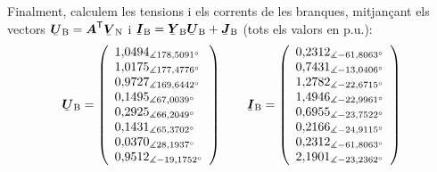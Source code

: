 \begin{exemple}
Finalment, calculem les tensions i els corrents de les branques,
mitjan\c{c}ant els vectors $\mcmplx{U}\ped{B} = \transp{\boldsymbol{A}}
\mcmplx{V}\ped{N}$ i $\mcmplx{I}\ped{B} =  \mcmplx{Y}\ped{B}
\mcmplx{U}\ped{B} + \mcmplx{J}\ped{B}$ (tots els valors en p.u.):
\[
   \mcmplx{U}\ped{B} =
   \left(\begin{array}{l}
     1{,}0494_{\measuredangle 178{,}5091\degree} \\
     1{,}0175_{\measuredangle 177{,}4776\degree} \\
     0{,}9727_{\measuredangle 169{,}6442\degree} \\
     0{,}1495_{\measuredangle 67{,}0039\degree} \\
     0{,}2925_{\measuredangle 66{,}2049\degree} \\
     0{,}1431_{\measuredangle 65{,}3702\degree} \\
     0{,}0370_{\measuredangle 28{,}1937\degree} \\
     0{,}9512_{\measuredangle -19{,}1752\degree}
   \end{array}\right)
   \qquad
   \mcmplx{I}\ped{B} =
   \left(\begin{array}{l}
     0{,}2312_{\measuredangle -61{,}8063\degree} \\
     0{,}7431_{\measuredangle -13{,}0406\degree} \\
     1{,}2782_{\measuredangle -22{,}6715\degree} \\
     1{,}4946_{\measuredangle -22{,}9961\degree} \\
     0{,}6955_{\measuredangle -23{,}7522\degree} \\
     0{,}2166_{\measuredangle -24{,}9115\degree} \\
     0{,}2312_{\measuredangle -61{,}8063\degree} \\
     2{,}1901_{\measuredangle -23{,}2362\degree}
   \end{array}\right)
\]


\end{exemple}
